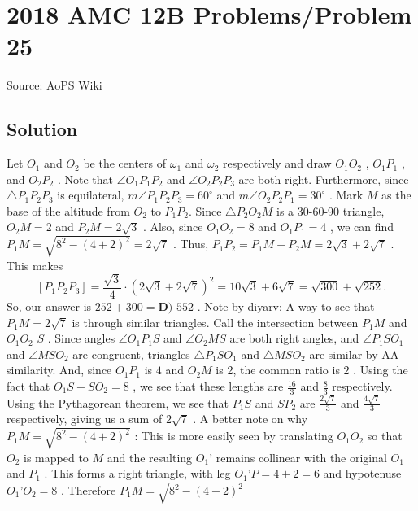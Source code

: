 \documentclass[12pt]{article}
\begin{document}
\section*{{2018 AMC 12B Problems/Problem 25}}
Source: AoPS Wiki

\subsection*{Solution}
Let $O_1$ and $O_2$ be the centers of $\omega_1$ and $\omega_2$ respectively and draw $O_1O_2$ , $O_1P_1$ , and $O_2P_2$ . Note that $\angle{O_1P_1P_2}$ and $\angle{O_2P_2P_3}$ are both right. Furthermore, since $\triangle{P_1P_2P_3}$ is equilateral, $m\angle{P_1P_2P_3} = 60^\circ$ and $m\angle{O_2P_2P_1} = 30^\circ$ . Mark $M$ as the base of the altitude from $O_2$ to $P_1P_2.$ Since $\triangle P_2O_2M$ is a 30-60-90 triangle, $O_2M = 2$ and $P_2M = 2\sqrt{3}$ . Also, since $O_1O_2 = 8$ and $O_1P_1 = 4$ , we can find $P_1M = \sqrt{8^2 - (4 + 2)^2} = 2\sqrt{7}$ . Thus, $P_1P_2 = P_1M + P_2M = 2\sqrt{3} + 2\sqrt{7}$ . This makes \[\left[P_1P_2P_3\right] = \frac{\sqrt 3}4\cdot\left(2\sqrt 3 + 2\sqrt 7\right)^2 = 10\sqrt 3 + 6\sqrt 7 = \sqrt{300} + \sqrt{252}.\] So, our answer is $252 + 300 = \boxed{\textbf{D) }552}$ . Note by diyarv: A way to see that $P_1M = 2{\sqrt 7}$ is through similar triangles. Call the intersection between $P_1M$ and $O_1O_2$ $S$ . Since angles $\angle{O_1P_1S}$ and $\angle{O_2MS}$ are both right angles, and $\angle{P_1SO_1}$ and $\angle{MSO_2}$ are congruent, triangles $\triangle{P_1SO_1}$ and $\triangle{MSO_2}$ are similar by AA similarity. And, since $O_1P_1$ is $4$ and $O_2M$ is 2, the common ratio is $2$ . Using the fact that $O_1S + SO_2 = 8$ , we see that these lengths are $\frac{16}{3}$ and $\frac{8}{3}$ respectively. Using the Pythagorean theorem, we see that $P_1S$ and $SP_2$ are $\frac{2\sqrt{7}}{3}$ and $\frac{4\sqrt{7}}{3}$ respectively, giving us a sum of $2\sqrt{7}$ . A better note on why $P_1M = \sqrt{8^2 - (4 + 2)^2}$ : This is more easily seen by translating $O_1O_2$ so that $O_2$ is mapped to $M$ and the resulting $O_1’$ remains collinear with the original $O_1$ and $P_1$ . This forms a right triangle, with leg $O_1’ P = 4+2 = 6$ and hypotenuse $O_1’O_2 = 8$ . Therefore $P_1M = \sqrt{8^2 - (4 + 2)^2}$
\end{document}
